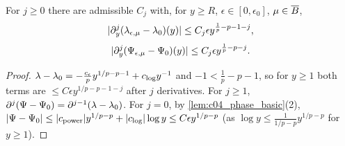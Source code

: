 \begin{lemma}
  \label{lem:c04_lambda_psi_difference}
  For $j\ge0$ there are admissible $C_j$ with, for $y\ge R$, $\epsilon\in[0,\epsilon_0]$, $\mu\in\overline{B}$,
  \begin{equation}\label{eqn:approx_lambda_difference}
    |\partial^j_y(\lambda_{\epsilon,\mu}-\lambda_0)(y)|\le C_j\epsilon y^{\frac1p-p-1-j},
  \end{equation}
  \begin{equation}\label{eqn:approx_phase_difference}
    |\partial^j_y(\Psi_{\epsilon,\mu}-\Psi_0)(y)|\le C_j\epsilon y^{\frac1p-p-j}.
  \end{equation}
\end{lemma}
\begin{proof}
  $\lambda-\lambda_0=-\frac{c_\epsilon}py^{1/p-p-1}+c_{\textup{log}}y^{-1}$ and $-1<\frac1p-p-1$, so for $y\ge1$ both terms are
  $\le C\epsilon y^{1/p-p-1-j}$ after $j$ derivatives. For $j\ge1$, $\partial^j(\Psi-\Psi_0)=\partial^{j-1}(\lambda-\lambda_0)$. For $j=0$, by
  \cref{lem:c04_phase_basic}(2), $|\Psi-\Psi_0|\le|c_{\textup{power}}|y^{1/p-p}+|c_{\textup{log}}|\log y\le C\epsilon y^{1/p-p}$
  (as $\log y\le\frac{1}{1/p-p}y^{1/p-p}$ for $y\ge1$).
\end{proof}

